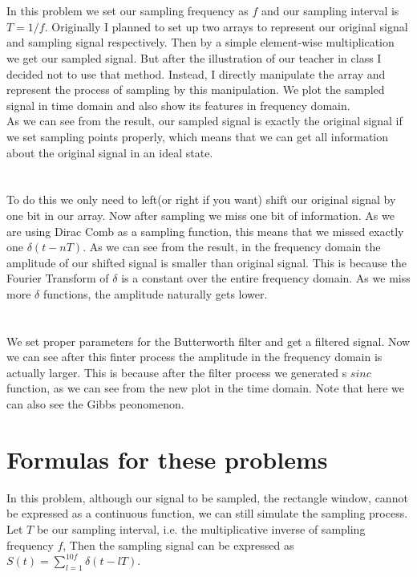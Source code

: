 \documentclass[12pt,letterpaper]{article}
\begin{document}
\section{}
In this problem we set our sampling frequency as $f$ and our sampling interval is $T=1/f$. Originally I planned to set up two arrays to represent our original signal and sampling signal respectively. Then by a simple element-wise multiplication we get our sampled signal. But after the illustration of our teacher in class I decided not to use that method. Instead, I directly manipulate the array and represent the process of sampling by this manipulation. We plot the sampled signal in time domain and also show its features in frequency domain.\\
As we can see from the result, our sampled signal is exactly the original signal if we set sampling points properly, which means that we can get all information about the original signal in an ideal state.
\section{}
To do this we only need to left(or right if you want) shift our original signal by one bit in our array. Now after sampling we miss one bit of information. As we are using Dirac Comb as a sampling function, this means that we missed exactly one $\delta(t-nT)$. As we can see from the result, in the frequency domain the amplitude of our shifted signal is smaller than original signal. This is because the Fourier Transform of $\delta$ is a constant over the entire frequency domain. As we miss more $\delta$ functions, the amplitude naturally gets lower.
\section{}
We set proper parameters for the Butterworth filter and get a filtered signal. Now we can see after this finter process the amplitude in the frequency domain is actually larger. This is because after the filter process we generated s $sinc$ function, as we can see from the new plot in the time domain. Note that here we can also see the Gibbs peonomenon. 

\newpage 
\section{Formulas for these problems}
In this problem, although our signal to be sampled, the rectangle window, cannot be expressed as a continuous function, we can still simulate the sampling process. Let $T$ be our sampling interval, i.e. the multiplicative inverse of sampling frequency $f$, Then the sampling signal can be expressed as $S(t)=\sum_{l=1}^{10f}\delta(t-lT)$.
\end{document}
